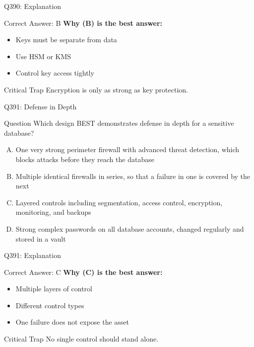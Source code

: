 \documentclass{beamer}
\begin{document}
	\begin{frame}{Q390: Explanation}
		\begin{block}{Correct Answer: B}
			\textbf{Why (B) is the best answer:}
			\begin{itemize}
				\item Keys must be separate from data
				\item Use HSM or KMS
				\item Control key access tightly
			\end{itemize}
		\end{block}
		\begin{alertblock}{Critical Trap}
			Encryption is only as strong as key protection.
		\end{alertblock}
	\end{frame}
	
	\begin{frame}{Q391: Defense in Depth}
		\begin{block}{Question}
			\small Which design BEST demonstrates defense in depth for a sensitive database?
		\end{block}
		\begin{enumerate}[(A)]
			\footnotesize
			\item One very strong perimeter firewall with advanced threat detection, which blocks attacks before they reach the database
			\item Multiple identical firewalls in series, so that a failure in one is covered by the next
			\item Layered controls including segmentation, access control, encryption, monitoring, and backups
			\item Strong complex passwords on all database accounts, changed regularly and stored in a vault
		\end{enumerate}
	\end{frame}
	
	\begin{frame}{Q391: Explanation}
		\begin{block}{Correct Answer: C}
			\textbf{Why (C) is the best answer:}
			\begin{itemize}
				\item Multiple layers of control
				\item Different control types
				\item One failure does not expose the asset
			\end{itemize}
		\end{block}
		\begin{alertblock}{Critical Trap}
			No single control should stand alone.
		\end{alertblock}
	\end{frame}
	
\end{document}
